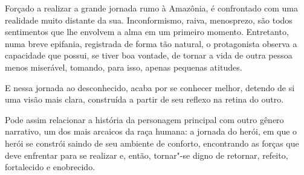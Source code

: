 Forçado a realizar a grande jornada rumo à Amazônia, é confrontado com
uma realidade muito distante da sua. Inconformismo, raiva, menosprezo,
são todos sentimentos que lhe envolvem a alma em um primeiro momento.
Entretanto, numa breve epifania, registrada de forma tão natural, o
protagonista observa a capacidade que possui, se tiver boa vontade, de
tornar a vida de outra pessoa menos miserável, tomando, para isso,
apenas pequenas atitudes.

E nessa jornada ao desconhecido, acaba por se conhecer melhor, detendo
de si uma visão mais clara, construída a partir de seu reflexo na retina
do outro. 

Pode assim relacionar a história da personagem principal com outro gênero narrativo, um dos mais arcaicos da raça humana: a jornada do herói, em que o herói se constrói saindo de seu ambiente de conforto,
encontrando as forças que deve enfrentar para se realizar e, então,
tornar"-se digno de retornar, refeito, fortalecido e enobrecido.



